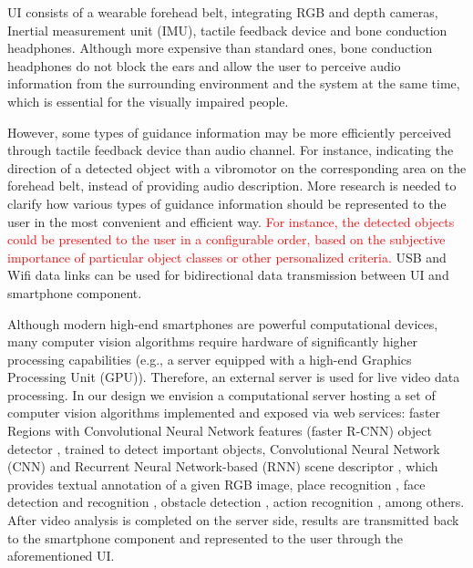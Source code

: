 \documentclass[10pt,conference,compsocconf]{IEEEtran}
\begin{document}

UI consists of a wearable forehead belt, integrating RGB and depth cameras, Inertial measurement unit (IMU), tactile feedback device and bone conduction headphones. Although more expensive than standard ones, bone conduction headphones do not block the ears and allow the user to perceive audio information from the surrounding environment and the system at the same time, which is essential for the visually impaired people. 


However, some types of guidance information may be more efficiently perceived through tactile feedback device than audio channel. For instance, indicating the direction of a detected object with a vibromotor on the corresponding area on the forehead belt, instead of providing audio description. More research is needed to clarify how various types of guidance information should be represented to the user in the most convenient and efficient way. \textcolor{red}{ For instance, the detected objects could be presented to the user in a configurable order, based on the subjective importance of particular object classes or other personalized criteria.} USB and Wifi data links can be used for bidirectional data transmission between UI and smartphone component.


Although modern high-end smartphones are powerful computational devices, many computer vision algorithms  require hardware of significantly higher processing capabilities (e.g., a server equipped with a high-end Graphics Processing Unit (GPU)). Therefore, an external server is used for live video data processing. In our design we envision a computational server hosting a set of computer vision algorithms implemented and exposed via web services: faster Regions with Convolutional Neural Network features (faster R-CNN) object detector \cite{Ren}, trained to detect important objects, Convolutional Neural Network (CNN) and Recurrent Neural Network-based (RNN) scene descriptor \cite{Liu}, which provides textual annotation of a given RGB image, place recognition \cite{Ohn-Bar}, face detection and recognition \cite{Amos}, obstacle detection \cite{Laina}, action recognition \cite{Valor}, among others. After video analysis is completed on the server side, results are transmitted back to the smartphone component and represented to the user through the aforementioned UI.
\end{document}

